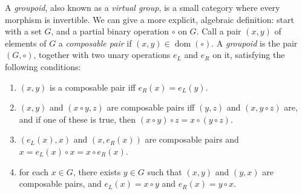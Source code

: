 \documentclass[12pt]{article}
\begin{document}
A \emph{groupoid}, also known as a \emph{virtual group}, is a small category where every morphism is invertible.  We can give a more explicit, algebraic definition: start with a set $G$, and a partial binary operation $\circ$ on $G$.  Call a pair $(x,y)$ of elements of $G$ a \emph{composable pair} if $(x,y)\in\operatorname{dom}(\circ)$.  A \emph{groupoid} is the pair $(G,\circ)$, together with two unary operations $e_L$ and $e_R$ on it, satisfying  the following conditions:
\begin{enumerate}
\item $(x,y)$ is a composable pair iff $e_R(x)=e_L(y)$.
\item $(x,y)$ and $(x\circ y, z)$ are composable pairs iff $(y,z)$ and $(x,y\circ z)$ are, and if one of these is true, then $(x\circ y)\circ z=x\circ (y\circ z)$.
\item $(e_L(x),x)$ and $(x,e_R(x))$ are composable pairs and $x=e_L(x)\circ x=x\circ e_R(x)$.
\item for each $x\in G$, there exists $y\in G$ such that $(x,y)$ and $(y,x)$ are composable pairs, and $e_L(x)=x\circ y$ and $e_R(x)=y\circ x$.
\end{enumerate}
\end{document}
